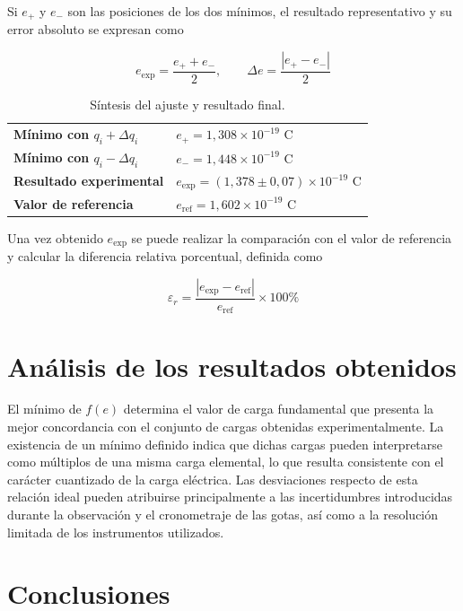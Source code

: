 \documentclass{article}
\begin{document}
Si $e_+$ y $e_-$ son las posiciones de los dos mínimos, el resultado representativo y su error absoluto se expresan como

\begin{equation}
e_{\mathrm{exp}}=\frac{e_++e_-}{2},\qquad
\Delta e=\frac{\left|e_+-e_-\right|}{2}
\end{equation}

\begin{table}[H]
\centering
\small
\caption{Síntesis del ajuste y resultado final.}
\begin{tabularx}{\textwidth}{@{}>{\bfseries}L{5.5cm}Y@{}}
    \toprule
    Mínimo con $q_i+\Delta q_i$ & $e_+ = 1,308 \times 10^{-19}$ C \\
    Mínimo con $q_i-\Delta q_i$ & $e_-= 1,448 \times 10^{-19}$ C \\
    \midrule
    Resultado experimental & $e_{\mathrm{exp}} = (1,378 \pm 0,07) \times 10^{-19}$ C \\
    Valor de referencia & $e_{\mathrm{ref}} = 1,602 \times 10^{-19}$ C \\
    \bottomrule
\end{tabularx}
\end{table}

Una vez obtenido $e_{\mathrm{exp}}$ se puede realizar la comparación con el valor de referencia y calcular la diferencia relativa porcentual, definida como

\begin{equation}
\varepsilon_r=\frac{\left|e_{\mathrm{exp}}-e_{\mathrm{ref}}\right|}{e_{\mathrm{ref}}}\times100\%
\end{equation}

\section{Análisis de los resultados obtenidos}

El mínimo de $f(e)$ determina el valor de carga fundamental que presenta la mejor concordancia con el conjunto de cargas obtenidas experimentalmente. La existencia de un mínimo definido indica que dichas cargas pueden interpretarse como múltiplos de una misma carga elemental, lo que resulta consistente con el carácter cuantizado de la carga eléctrica. Las desviaciones respecto de esta relación ideal pueden atribuirse principalmente a las incertidumbres introducidas durante la observación y el cronometraje de las gotas, así como a la resolución limitada de los instrumentos utilizados.

\section{Conclusiones}
\end{document}
